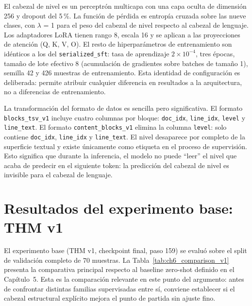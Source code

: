 \medskip
El cabezal de nivel es un perceptrón multicapa con una capa oculta de dimensión 256 y dropout del 5\,\%. La función de pérdida es entropía cruzada sobre las nueve clases,
con $\lambda$ = 1 para el peso del cabezal de nivel respecto al cabezal de lenguaje. Los adaptadores LoRA tienen rango 8, escala 16 y se aplican a las proyecciones de atención
(Q, K, V, O). El resto de hiperparámetros de entrenamiento son idénticos a los del \texttt{serialized\_sft}: tasa de aprendizaje $2 \times 10^{-4}$, tres épocas, tamaño de lote
efectivo 8 (acumulación de gradientes sobre batches de tamaño 1), semilla 42 y 426 muestras de entrenamiento. Esta identidad de configuración es deliberada: permite atribuir
cualquier diferencia en resultados a la arquitectura, no a diferencias de entrenamiento.

La transformación del formato de datos es sencilla pero significativa. El formato \texttt{blocks\_tsv\_v1} incluye cuatro columnas por bloque: \texttt{doc\_idx}, \texttt{line\_idx},
\texttt{level} y \texttt{line\_text}. El formato \texttt{content\_blocks\_v1} elimina la columna \texttt{level}: solo contiene \texttt{doc\_idx}, \texttt{line\_idx} y \texttt{line\_text}.
El nivel desaparece por completo de la superficie textual y existe únicamente como etiqueta en el proceso de supervisión. Esto significa que durante la inferencia, el modelo no
puede ``leer'' el nivel que acaba de predecir en el siguiente token: la predicción del cabezal de nivel es invisible para el cabezal de lenguaje.


\section{Resultados del experimento base: THM v1}
\label{sec:ch6_twohead_v1}

El experimento base (THM v1, checkpoint final, paso 159) se evaluó sobre el split de validación completo de 70 muestras. La Tabla~\ref{tab:ch6_comparison_v1}
presenta la comparativa principal respecto al baseline zero-shot definido en el Capítulo~5. Esta es la comparación relevante en este punto del argumento: antes de confrontar distintas
familias supervisadas entre sí, conviene establecer si el cabezal estructural explícito mejora el punto de partida sin ajuste fino.

